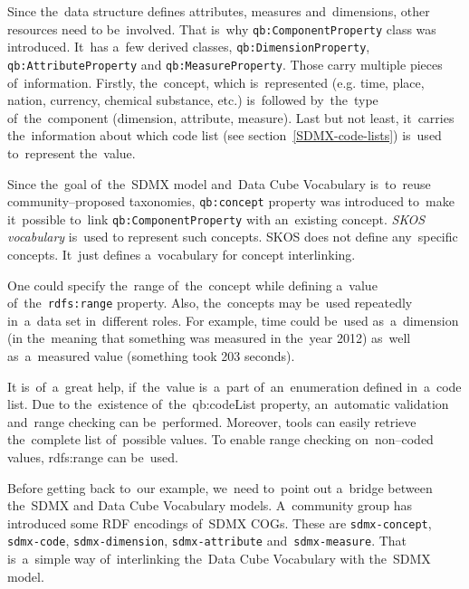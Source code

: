 \begin{sloppypar}
Since the~data structure defines attributes, measures and~dimensions, other resources need
to be~involved. That is~why \texttt{qb:ComponentProperty} class was introduced. It~has a~few derived
classes, \texttt{qb:DimensionProperty}, \texttt{qb:AttributeProperty}
and \texttt{qb:MeasureProperty}. Those carry
multiple pieces of~information. Firstly, the~concept, which is~represented (e.g. time, place,
nation, currency, chemical substance, etc.) is~followed by~the~type of~the~component
(dimension, attribute, measure). Last but not least, it~carries the~information about which
code list (see section~\ref{SDMX-code-lists}) is~used to~represent the~value.
\end{sloppypar}

Since the~goal of~the~SDMX model and~Data Cube Vocabulary is~to~reuse community--proposed
taxonomies, \texttt{qb:concept} property was introduced to~make it~possible to~link
\texttt{qb:ComponentProperty} with an~existing concept. \emph{SKOS vocabulary} is~used to
represent such concepts. SKOS does not define any~specific concepts. It~just defines
a~vocabulary for concept interlinking.

\begin{sloppypar}
One could specify the~range of~the~concept while defining a~value of~the~\texttt{rdfs:range} property.
Also, the~concepts may be~used repeatedly in~a~data set in~different roles.
For example, time could be~used as~a~dimension (in the~meaning that something was measured
in the~year 2012) as~well as~a~measured value (something took 203 seconds).
\end{sloppypar}

It is~of~a~great help, if~the~value is~a~part of~an~enumeration defined in~a~code list. Due to
the~existence of~the~qb:codeList property, an~automatic validation and~range checking
can be~performed. Moreover, tools can easily retrieve the~complete list of~possible values.
To enable range checking on~non--coded values, rdfs:range can be~used.

\begin{sloppypar}
Before getting back to~our example, we~need to~point out a~bridge between the~SDMX
and Data Cube Vocabulary models. A~community group has introduced some RDF 
encodings of~SDMX COGs. These are \texttt{sdmx-concept}, \texttt{sdmx-code}, \texttt{sdmx-dimension},
\texttt{sdmx-attribute} and~\texttt{sdmx-measure}. That is~a~simple way of~interlinking the~Data Cube
Vocabulary with the~SDMX model.
\end{sloppypar}

